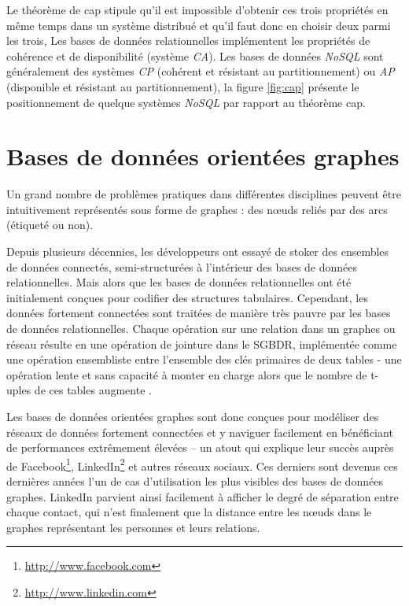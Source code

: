 \begin{itemize}
  Le théorème de \acrshort{cap} stipule qu'il est impossible d'obtenir
  ces trois propriétés en même temps dans un système distribué et
  qu'il faut donc en choisir deux parmi les trois, Les bases de
  données relationnelles implémentent les propriétés de cohérence et
  de disponibilité (système \emph{CA}). Les bases de données
  \emph{NoSQL} sont généralement des systèmes \emph{CP} (cohérent et
  résistant au partitionnement) ou \emph{AP} (disponible et résistant
  au partitionnement), la figure \ref{fig:cap} présente le
  positionnement de quelque systèmes \emph{NoSQL} par rapport au
  théorème \acrshort{cap}.

\section{Bases de données orientées graphes}
\label{sec:graph-database-overview}
\begin{text}
  Un grand nombre de problèmes pratiques dans différentes disciplines
  peuvent être intuitivement représentés sous forme de graphes : des
  nœuds reliés par des arcs (étiqueté ou non).

  Depuis plusieurs décennies, les développeurs ont essayé de stoker
  des ensembles de données connectés, semi-structurées à l'intérieur
  des bases de données relationnelles. Mais alors que les bases de
  données relationnelles ont été initialement conçues pour codifier
  des structures tabulaires. Cependant, les données fortement
  connectées sont traitées de manière très pauvre par les bases de
  données relationnelles. Chaque opération sur une relation dans un
  graphes ou réseau résulte en une opération de jointure dans le
  \acrshort{SGBDR}, implémentée comme une opération ensembliste entre
  l'ensemble des clés primaires de deux tables - une opération lente
  et sans capacité à monter en charge alors que le nombre de t-uples
  de ces tables augmente \cite{robinson2013graph}.

  Les bases de données orientées graphes sont donc conçues pour
  modéliser des réseaux de données fortement connectées et y naviguer
  facilement en bénéficiant de performances extrêmement élevées – un
  atout qui explique leur succès auprès de
  Facebook\footnote{\url{http://www.facebook.com}},
  LinkedIn\footnote{\url{http://www.linkedin.com}} et autres réseaux
  sociaux. Ces derniers sont devenus ces dernières années l'un de cas
  d'utilisation les plus visibles des bases de données graphes.
  LinkedIn parvient ainsi facilement à afficher le degré de séparation
  entre chaque contact, qui n'est finalement que la distance entre les
  nœuds dans le graphes représentant les personnes et leurs relations.
\end{text}


\end{itemize}
